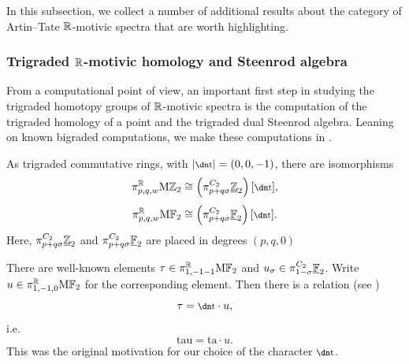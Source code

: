 In this subsection, we collect a number of additional results about the category of Artin--Tate $\mathbb{R}$-motivic spectra that are worth highlighting.%


\subsubsection{Trigraded $\mathbb{R}$-motivic homology and Steenrod algebra}
From a computational point of view, an important first step in studying the trigraded homotopy groups of $\mathbb{R}$-motivic spectra is the computation of the trigraded homology of a point and the trigraded dual Steenrod algebra. Leaning on known bigraded computations, we make these computations in .
%

\begin{prop}
As trigraded commutative rings, with $|\ta|=(0,0,-1)$, there are isomorphisms
$$\pi^{\R}_{p,q,w} \HZt \cong \left(\pi^{C_2}_{p+q\sigma}\uZt\right)[\ta],$$
$$\pi^{\R}_{p,q,w} \HFt \cong \left(\pi^{C_2}_{p+q\sigma}\uFt\right)[\ta].$$
Here, $\pi^{C_2}_{p+q\sigma}\underline{\mathbb{Z}}_{2}$ and $\pi^{C_2}_{p+q\sigma}\underline{\mathbb{F}}_2$ are placed in degrees $(p,q,0)$
\end{prop}

\begin{rmk}\label{rmk:ta-explanation}
  There are well-known elements $\tau \in \pi_{1,-1-1} ^{\mathbb{R}} \mathrm{M}\mathbb{F}_2$ and $u_{\sigma} \in \pi_{1-\sigma} ^{C_2} \underline{\mathbb{F}}_2$. Write $u \in \pi_{1,-1,0} ^{\mathbb{R}} \mathrm{M}\mathbb{F}_2$ for the corresponding element.
  Then there is a relation (see )
  \[\tau = \ta \cdot u,\]
  i.e.
  \[\mathrm{tau} = \mathrm{ta} \cdot u.\]
  This was the original motivation for our choice of the character $\ta$.
\end{rmk}

